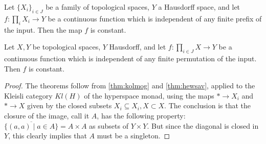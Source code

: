 \documentclass[11pt]{article}
\begin{document}
\begin{corollary}
    Let $\{X_i\}_{i \in J}$ be a family of topological spaces, $Y$ a Hausdorff space, and let $f: \prod_i X_i \to Y$ be a continuous function
    which is independent of any finite prefix of the input.
    Then the map $f$ is constant.
\end{corollary}
\begin{corollary}
    Let $X, Y$ be topological spaces, $Y$ Hausdorff, and let $f: \prod_{i\in J} X \to Y$ be a continuous function which is independent of any finite permutation of the input.
    Then $f$ is constant.
\end{corollary}
\begin{proof}
    The theorems follow from \cref{thm:kolmog} and \cref{thm:hewsav}, applied to the Kleisli category $Kl(H)$ of the hyperspace monad,
    using the maps $* \to X_i$ and $* \to X$ given by the closed subsets $X_i \subseteq X_i, X \subset X$.
    The conclusion is that the closure of the image, call it $A$, has the following property: $\overline{\{(a,a) \mid a \in A\}} = A \times A$ as subsets of $Y \times Y$.
    But since the diagonal is closed in $Y$, this clearly implies that $A$ must be a singleton.
\end{proof}




\end{document}
